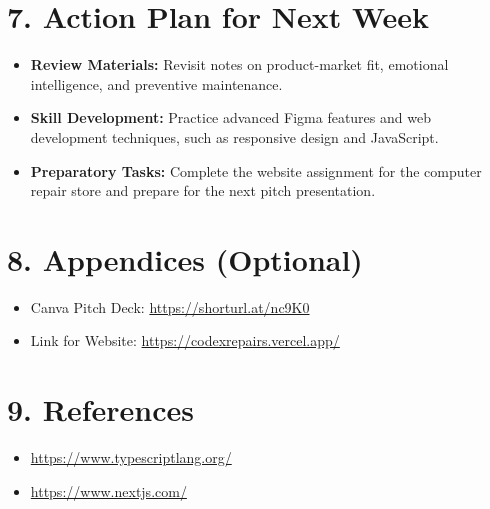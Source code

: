 \documentclass{article}
\begin{document}
\section*{7. Action Plan for Next Week}
\begin{itemize}
    \item \textbf{Review Materials:} Revisit notes on product-market fit, emotional intelligence, and preventive maintenance.
    \item \textbf{Skill Development:} Practice advanced Figma features and web development techniques, such as responsive design and JavaScript.
    \item \textbf{Preparatory Tasks:} Complete the website assignment for the computer repair store and prepare for the next pitch presentation.
\end{itemize}

\section*{8. Appendices (Optional)}
\begin{itemize}
    \item Canva Pitch Deck: \url{https://shorturl.at/nc9K0}
    \item Link for Website: \url{https://codexrepairs.vercel.app/}
\end{itemize}

\section*{9. References}
\begin{itemize}
    \item \url{https://www.typescriptlang.org/}
    \item \url{https://www.nextjs.com/}
\end{itemize}
\end{document}
